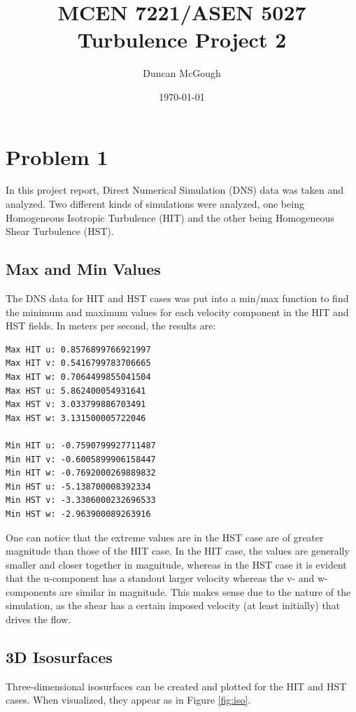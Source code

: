 \documentclass[12pt]{article}
\title{MCEN 7221/ASEN 5027 Turbulence Project 2}
\author{Duncan McGough}
\date{\today}
\begin{document}
\maketitle

\tableofcontents
\listoffigures
\newpage

\section{Problem 1}
In this project report, Direct Numerical Simulation (DNS) data was taken and analyzed. Two different kinds of simulations were analyzed, one being Homogeneous Isotropic Turbulence (HIT) and the other being Homogeneous Shear Turbulence (HST). 

\subsection{Max and Min Values}
The DNS data for HIT and HST cases was put into a min/max function to find the minimum and maximum values for each velocity component in the HIT and HST fields. In meters per second, the results are:
\begin{lstlisting}
Max HIT u: 0.8576899766921997
Max HIT v: 0.5416799783706665
Max HIT w: 0.7064499855041504
Max HST u: 5.862400054931641
Max HST v: 3.033799886703491
Max HST w: 3.131500005722046

Min HIT u: -0.7590799927711487
Min HIT v: -0.6005899906158447
Min HIT w: -0.7692000269889832
Min HST u: -5.138700008392334
Min HST v: -3.3306000232696533
Min HST w: -2.963900089263916
\end{lstlisting}

One can notice that the extreme values are in the HST case are of greater magnitude than those of the HIT case. In the HIT case, the values are generally smaller and closer together in magnitude, whereas in the HST case it is evident that the u-component has a standout larger velocity whereas the v- and w-components are similar in magnitude. This makes sense due to the nature of the simulation, as the shear has a certain imposed velocity (at least initially) that drives the flow. 

\subsection{3D Isosurfaces}
Three-dimensional isosurfaces can be created and plotted for the HIT and HST cases. When visualized, they appear as in Figure \ref{fig:iso}.
\end{document}
